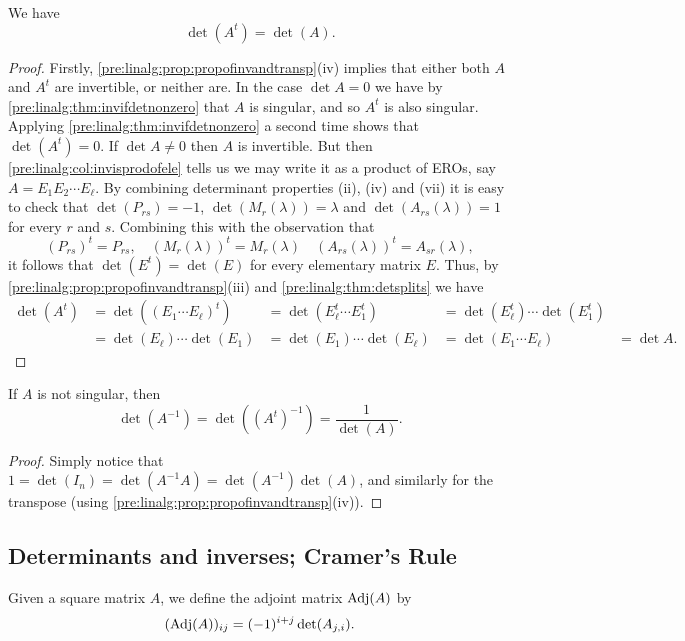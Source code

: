 \documentclass[10pt, a4paper]{article}
\begin{document}
\begin{theorem}
    We have
    \[
    \det(A ^ t) = \det(A).
    \]
    \begin{proof}
        Firstly,
        \autoref{pre:linalg:prop:propofinvandtransp}(iv) implies that either both $A$ and $A ^ t$ are invertible,
        or neither are.
        In the case $\det A = 0$ we have by \autoref{pre:linalg:thm:invifdetnonzero} that $A$ is singular,
        and so $A ^ t$ is also singular.
        Applying \autoref{pre:linalg:thm:invifdetnonzero} a second time shows that $\det(A ^ t) = 0$.
        If $\det A \neq 0$ then $A$ is invertible.
        But then \autoref{pre:linalg:col:invisprodofele} tells us we may write it as a product of EROs,
        say $A = E_1E_2\dotsi E_\ell$.
        By combining determinant properties (ii),
        (iv) and (vii) it is easy to check that $\det(P_{rs}) = -1$,
        $\det(M_r(\lambda)) = \lambda$ and $\det(A_{rs}(\lambda)) = 1$ for every $r$ and $s$.
        Combining this with the observation that
        \[
        (P_{rs}) ^ t = P_{rs},\quad(M_{r}(\lambda)) ^ t = M_r(\lambda)\quad(A_{rs}(\lambda)) ^ t = A_{sr}(\lambda),
        \]
        it follows that $\det(E ^ t) = \det(E)$ for every elementary matrix $E$.
        Thus,
        by \autoref{pre:linalg:prop:propofinvandtransp}(iii) and \autoref{pre:linalg:thm:detsplits} we have
        \begin{align*}
            \det(A ^ t) &= \det((E_1\dotsi E_\ell) ^ t) &= \det(E_\ell ^ t \dotsi E_1 ^ t) &= \det(E_\ell ^ t)\dotsi\det(E_1 ^ t) \\
            &= \det(E_\ell)\dotsi\det(E_1) &= \det(E_1)\dotsi\det(E_\ell) &= \det(E_1 \dotsi E_\ell) &= \det A.
        \end{align*}
    \end{proof}
\end{theorem}

\begin{corollary}
    If $A$ is not singular,
    then
    \[
    \det(A ^ {-1}) = \det((A ^ t) ^ {-1}) = \frac{1}{\det(A)}.
    \]
    \begin{proof}
        Simply notice that $1 = \det(I_n) = \det(A ^ {-1}A) = \det(A ^ {-1})\det(A)$,
        and similarly for the transpose (using \autoref{pre:linalg:prop:propofinvandtransp}(iv)).
    \end{proof}
\end{corollary}

\subsection{Determinants and inverses; Cramer's Rule}
\begin{definition}
    Given a square matrix $A$,
    we define the adjoint matrix $\operatorname{Adj}(A)$ by
    \[
    (\operatorname{Adj}(A))_{ij} = (-1) ^ {i + j}\det(A_{j, i}).
    \]
\end{definition}
\end{document}
